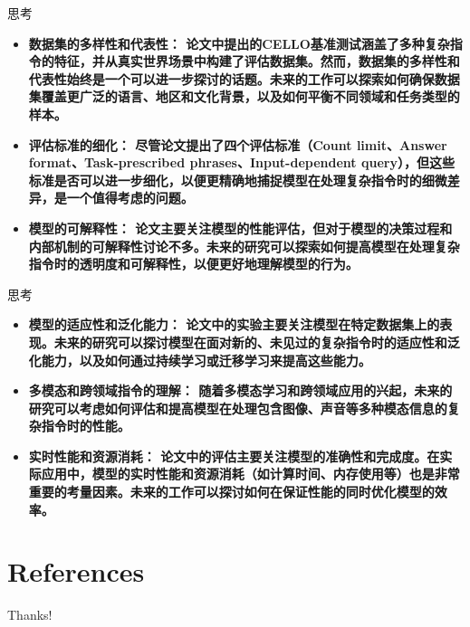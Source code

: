 \documentclass{beamer}
\begin{document}
\begin{frame}{思考}
    \begin{itemize}
        \item {\bfseries{数据集的多样性和代表性：}\normalfont
            论文中提出的CELLO基准测试涵盖了多种复杂指令的特征，并从真实世界场景中构建了评估数据集。然而，数据集的多样性和代表性始终是一个可以进一步探讨的话题。未来的工作可以探索如何确保数据集覆盖更广泛的语言、地区和文化背景，以及如何平衡不同领域和任务类型的样本。}
        \item {\bfseries{评估标准的细化：}\normalfont
            尽管论文提出了四个评估标准（Count limit、Answer format、Task-prescribed phrases、Input-dependent query），但这些标准是否可以进一步细化，以便更精确地捕捉模型在处理复杂指令时的细微差异，是一个值得考虑的问题。}
        \item {\bfseries{模型的可解释性：}\normalfont
            论文主要关注模型的性能评估，但对于模型的决策过程和内部机制的可解释性讨论不多。未来的研究可以探索如何提高模型在处理复杂指令时的透明度和可解释性，以便更好地理解模型的行为。}
    \end{itemize}
\end{frame}

\begin{frame}{思考}
    \begin{itemize}
        \item {\bfseries{模型的适应性和泛化能力：}\normalfont
            论文中的实验主要关注模型在特定数据集上的表现。未来的研究可以探讨模型在面对新的、未见过的复杂指令时的适应性和泛化能力，以及如何通过持续学习或迁移学习来提高这些能力。}
        \item {\bfseries{多模态和跨领域指令的理解：}\normalfont
            随着多模态学习和跨领域应用的兴起，未来的研究可以考虑如何评估和提高模型在处理包含图像、声音等多种模态信息的复杂指令时的性能。}
        \item {\bfseries{实时性能和资源消耗：}\normalfont
            论文中的评估主要关注模型的准确性和完成度。在实际应用中，模型的实时性能和资源消耗（如计算时间、内存使用等）也是非常重要的考量因素。未来的工作可以探讨如何在保证性能的同时优化模型的效率。}
    \end{itemize}
\end{frame}

\section{References}

\begin{frame}[allowframebreaks]
    \nocite{*} %
    
    
\end{frame}

\begin{frame}
    \begin{center}
        {\Huge\calligra Thanks!}
    \end{center}
\end{frame}
\end{document}
